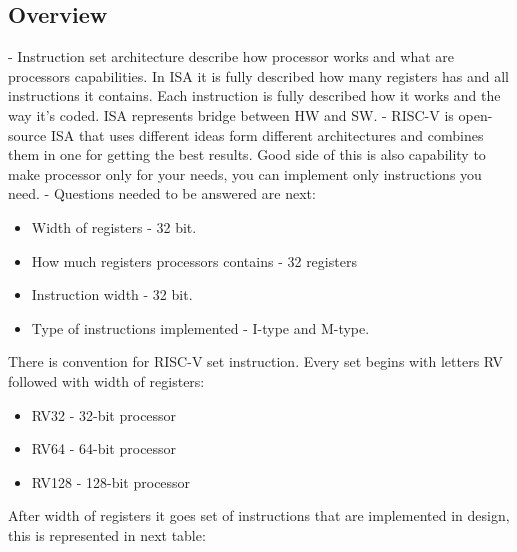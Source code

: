 \documentclass{scrreprt}
\begin{document}
    \subsection*{Overview}
    - Instruction set architecture describe how processor works and what are processors capabilities. In ISA it is fully described how many registers has and all instructions it contains. Each instruction is fully described how it works and the way it's coded. ISA represents bridge between HW and SW. 
    - RISC-V is open-source ISA that uses different ideas form different architectures and combines them in one for getting the best results. Good side of this is also capability to make processor only for your needs, you can implement only instructions you need. 
    - Questions needed to be answered are next:
    \begin{itemize}
        \item Width of registers - 32 bit.
        \item How much registers processors contains - 32 registers
        \item Instruction width - 32 bit.
        \item Type of instructions implemented - I-type and M-type. 
    \end{itemize}
    There is convention for RISC-V set instruction. Every set begins with letters RV followed with width of registers:
    \begin{itemize}
        \item  RV32 - 32-bit processor
        \item  RV64 - 64-bit processor
        \item  RV128 - 128-bit processor
    \end{itemize}
    After width of registers it goes set of instructions that are implemented in design, this is represented in next table:
    
\end{document}
